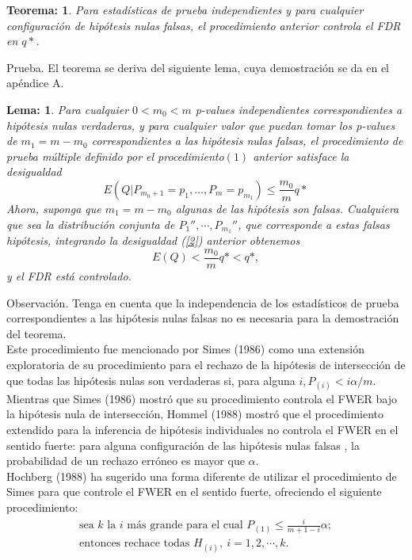 \documentclass[11pt,letterpaper]{article}
\newtheorem{thmt}{Teorema:}
\newtheorem{thml}{Lema:}
\begin{document}
\begin{framed}
    \begin{thmt} \label{t_1}
Para estadísticas de prueba independientes y para cualquier configuración de hipótesis nulas falsas, el procedimiento anterior controla el FDR en $q*$.
    \end{thmt}
\end{framed}

Prueba. El teorema se deriva del siguiente lema, cuya demostración se da en el apéndice A.

\begin{framed}
    \begin{thml} \label{l_1}
Para cualquier $0 <m_0 <m$ p-values independientes correspondientes a hipótesis nulas verdaderas, y para cualquier valor que puedan tomar los p-values de $m_1= m - m_0$ correspondientes a las hipótesis nulas falsas, el procedimiento de prueba múltiple definido por el procedimiento$(1)$ anterior satisface la desigualdad
\begin{equation}\label{2}
E (Q | P_{m_0+1}=p_1, ..., P_m = p_{m_1})\leq \frac{m_0}{m} q *
\end{equation}
Ahora, suponga que $m_1=m-m_0$ algunas de las hipótesis son falsas. Cualquiera que sea la distribución conjunta de $P_1'' ,\cdots, P_{m_1}''$, que corresponde a estas falsas hipótesis, integrando la desigualdad (\ref{2}) anterior obtenemos
\begin{equation*}
E(Q) <\frac{m_0}{m}q* <q *,
\end{equation*}
y el FDR está controlado.
    \end{thml}
\end{framed}


Observación. Tenga en cuenta que la independencia de los estadísticos de prueba correspondientes a las hipótesis nulas falsas no es necesaria para la demostración del teorema.\\

Este procedimiento fue mencionado por Simes (1986) como una extensión exploratoria de su procedimiento para el rechazo de la hipótesis de intersección de que todas las hipótesis nulas son verdaderas si, para alguna $i, P_{(i)} <i\alpha / m$. Mientras que Simes (1986) mostró que su procedimiento controla el FWER bajo la hipótesis nula de intersección, Hommel (1988) mostró que el procedimiento extendido para la inferencia de hipótesis individuales no controla el FWER en el sentido fuerte: para alguna configuración de las hipótesis nulas falsas , la probabilidad de un rechazo erróneo es mayor que $\alpha$.\\
Hochberg (1988) ha sugerido una forma diferente de utilizar el procedimiento de Simes para que controle el FWER en el sentido fuerte, ofreciendo el siguiente procedimiento:
\begin{align*}
\text{sea } k \text{ la } i \text{ más grande para el cual } P_{(1)}\leq \frac{i}{m+1-i}\alpha;\\
\text{entonces rechace todas } H_{(i)},\ i=1,2,\cdots, k.
\end{align*}
\end{document}
